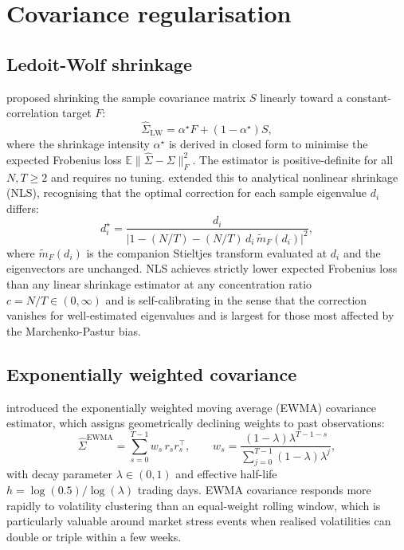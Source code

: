 \documentclass[a4paper,12pt]{report}
\begin{document}
\section{Covariance regularisation}
\label{sec:lit-cov}

\subsection{Ledoit-Wolf shrinkage}

\citet{ledoitwolf2004} proposed shrinking the sample covariance matrix $S$
linearly toward a constant-correlation target $F$:
\begin{equation}
  \hat{\Sigma}_{\mathrm{LW}} = \alpha^{\star} F + (1-\alpha^{\star}) S,
  \label{eq:lw}
\end{equation}
where the shrinkage intensity $\alpha^{\star}$ is derived in closed form to
minimise the expected Frobenius loss $\mathbb{E}\|\hat{\Sigma}-\Sigma\|_F^2$.
The estimator is positive-definite for all $N, T \geq 2$ and requires no
tuning. \citet{ledoitwolf2020} extended this to analytical nonlinear
shrinkage (NLS), recognising that the optimal correction for each sample
eigenvalue $d_i$ differs:
\begin{equation}
  d_i^{\star} =
    \frac{d_i}{\bigl|1 - (N/T) - (N/T)\,d_i\,\tilde{m}_F(d_i)\bigr|^2},
  \label{eq:nls}
\end{equation}
where $\tilde{m}_F(d_i)$ is the companion Stieltjes transform evaluated at
$d_i$ and the eigenvectors are unchanged. NLS achieves strictly lower expected
Frobenius loss than any linear shrinkage estimator at any concentration ratio
$c = N/T \in (0, \infty)$ and is self-calibrating in the sense that the
correction vanishes for well-estimated eigenvalues and is largest for those
most affected by the Marchenko-Pastur bias.

\subsection{Exponentially weighted covariance}

\citet{riskmetrics1996} introduced the exponentially weighted moving average
(EWMA) covariance estimator, which assigns geometrically declining weights to
past observations:
\begin{equation}
  \hat{\Sigma}^{\mathrm{EWMA}} = \sum_{s=0}^{T-1} w_s\, r_s r_s^{\top},
  \qquad
  w_s = \frac{(1-\lambda)\lambda^{T-1-s}}{\sum_{j=0}^{T-1}(1-\lambda)\lambda^j},
  \label{eq:ewma}
\end{equation}
with decay parameter $\lambda \in (0,1)$ and effective half-life
$h = \log(0.5)/\log(\lambda)$ trading days. EWMA covariance responds more
rapidly to volatility clustering than an equal-weight rolling window, which
is particularly valuable around market stress events when realised volatilities
can double or triple within a few weeks.
\end{document}
